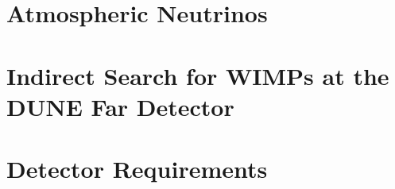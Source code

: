\section{Atmospheric Neutrinos}
\label{sec:physics-atmpdk-atmnu}


\section{Indirect Search for WIMPs at the DUNE Far Detector}
\label{sec:physics-atmpdk-wimps}

\section{Detector Requirements}
\label{sec:physics-atmpdk-detreq}


